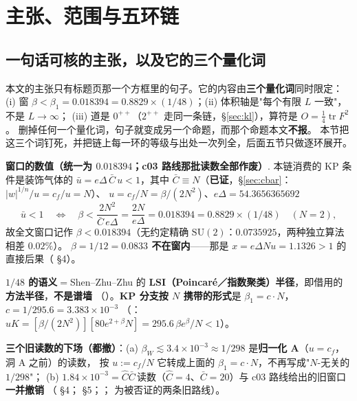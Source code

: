 \section{主张、范围与五环链}\label{sec:claim}

\subsection{一句话可核的主张，以及它的三个量化词}\LT

本文的主张只有标题页那一个方框里的句子。它的内容由\textbf{三个量化词}同时限定：
(i) 窗 $\beta<\beta_1=0.018394=0.8829\times(1/48)$；(ii) 体积轴是"每个有限 $L$ 一致"，不是 $L\to\infty$；
(iii) 道是 $0^{++}$（$2^{++}$ 走同一条链，\S\ref{sec:kl}），算符是 $O=\tfrac14\operatorname{tr}F^2$。
删掉任何一个量化词，句子就变成另一个命题，而那个命题本文\textbf{不报}。
本节把这三个词钉死，并把链上每一环的等级与出处一次列全，后面五节只做逐环展开。

\LM{} \textbf{窗口的数值（统一为 $0.018394$；c03 路线那批读数全部作废）}. 本链消费的 KP 条件是装饰气体的
$\bar u=e\Delta\,\bar C\,u<1$，其中 $\bar C\equiv N$（\textbf{已证}，\S\ref{sec:cbar}：$|w|^{1/n}/u=c_f/u=N$）、
$u=c_f/N=\beta/(2N^2)$、$e\Delta=54.3656365692$
\[
\bar u<1\quad\Longleftrightarrow\quad \beta<\frac{2N^2}{\bar C\,e\Delta}=\frac{2N}{e\Delta}=0.018394=0.8829\times(1/48)\quad(N=2),
\]
故全文窗口记作 $\beta<0.018394$（无约定精确 $\mathrm{SU}(2)$：$0.0735925$，两种独立算法相差 $0.02\%$）。
\textbf{$\beta=1/12=0.0833$ 不在窗内}——那是 $x=e\Delta Nu=1.1326>1$ 的直接后果（ \S4）。
\par\smallskip
\textbf{$1/48$ 的语义}$= $Shen--Zhu--Zhu 的 \textbf{LSI（Poincaré／指数聚类）半径}，即借用的\textbf{方法半径}，\textbf{不是谱墙}
（）。\textbf{KP 分支按 $N$ 携带的形式}是 $\beta_1=c\cdot N$，$c=1/295.6=3.383\times10^{-3}$
（：$uK=[\beta/(2N^2)][80e^{2+\beta}N]=295.6\,\beta e^\beta/N<1$）。
\par\smallskip
\textbf{三个旧读数的下场（都撤）}：(a) $\beta_W\lesssim3.4\times10^{-3}\approx1/298$ 是\textbf{归一化 A}（$u=c_f$，洞 A 之前）的读数，
按 $u:=c_f/N$ 它转成上面的 $\beta_1=c\cdot N$，不再写成"$N$-无关的 $1/298$"；
(b) $1.84\times10^{-3}=\hat C\bar C\,$读数（$\hat C=4$、$\bar C=20$）与 c03 路线给出的旧窗口\textbf{一并撤销}
（ \S4； \S5；； 为被否证的两条旧路线）。

